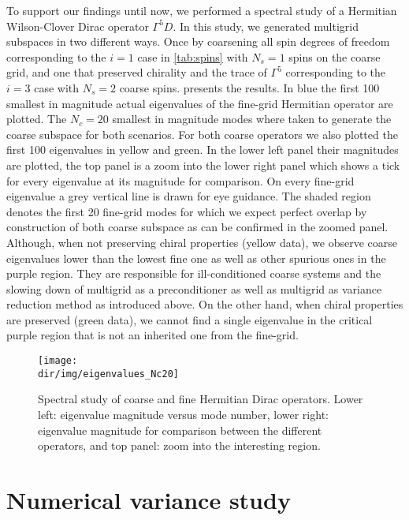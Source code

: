 To support our findings until now, we performed a spectral study of a Hermitian Wilson-Clover Dirac operator $\Gamma^{5} D$.
In this study, we generated multigrid subspaces in two different ways.
Once by coarsening all spin degrees of freedom corresponding to the $i=1$ case in \cref{tab:spins} with $N_s=1$ spins on the coarse grid, and one that preserved chirality and the trace of $\Gamma^{5}$ corresponding to the $i=3$ case with $N_s=2$ coarse spins.
 presents the results.
In blue the first \num{100} smallest in magnitude actual eigenvalues of the fine-grid Hermitian operator are plotted.
The $N_c=20$ smallest in magnitude modes where taken to generate the coarse subspace for both scenarios.
For both coarse operators we also plotted the first \num{100} eigenvalues in yellow and green.
In the lower left panel their magnitudes are plotted, the top panel is a zoom into the lower right panel which shows a tick for every eigenvalue at its magnitude for comparison.
On every fine-grid eigenvalue a grey vertical line is drawn for eye guidance.
The shaded region denotes the first \num{20} fine-grid modes for which we expect perfect overlap by construction of both coarse subspace as can be confirmed in the zoomed panel.
Although, when not preserving chiral properties (yellow data), we observe coarse eigenvalues lower than the lowest fine one as well as other spurious ones in the purple region.
They are responsible for ill-conditioned coarse systems and the slowing down of multigrid as a preconditioner as well as multigrid as variance reduction method as introduced above.
On the other hand, when chiral properties are preserved (green data), we cannot find a single eigenvalue in the critical purple region that is not an inherited one from the fine-grid.
\begin{figure}
\centering
\texttt{[image: \\dir/img/eigenvalues\_Nc20]}
\caption{
Spectral study of coarse and fine Hermitian Dirac operators. Lower left: eigenvalue magnitude versus mode number, lower right: eigenvalue magnitude for comparison between the different operators, and top panel: zoom into the interesting region.
\takenfull
}
\label{fig:chirality:spectrum}
\end{figure}

\section{Numerical variance study}

